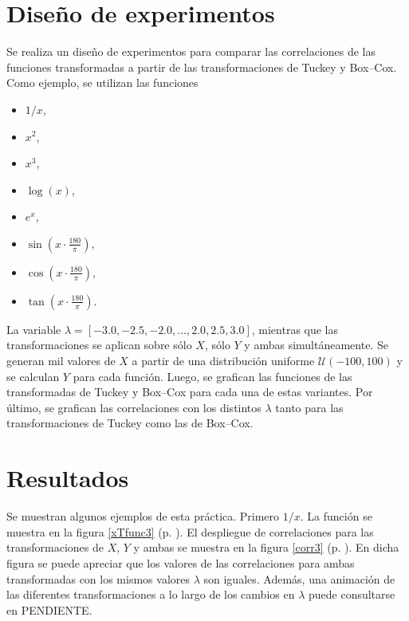 \documentclass[paper=leter, fontsize=11pt]{scrartcl}
\numberwithin{equation}{section}		%
\numberwithin{figure}{section}			%
\numberwithin{table}{section}				%
\begin{document}
\section{Diseño de experimentos}
Se realiza un diseño de experimentos para comparar las correlaciones de las funciones transformadas a partir de las transformaciones de Tuckey y Box--Cox. Como ejemplo, se utilizan las funciones
\begin{itemize}
    \item $1 / x$,
    \item $x ^ 2$,
    \item $x ^ 3$,
    \item $\log (x)$,
    \item $e ^ x$,
    \item $\sin(x \cdot \frac{180}{\pi})$,
    \item $\cos(x \cdot \frac{180}{\pi})$,
    \item $\tan(x \cdot \frac{180}{\pi})$.
\end{itemize}

La variable  $\lambda = [-3.0, -2.5, -2.0, \ldots, 2.0, 2.5, 3.0 ]$, mientras que las transformaciones se aplican sobre sólo $X$, sólo $Y$ y ambas simultáneamente. Se generan mil valores de $X$ a partir de una distribución uniforme $\mathcal{U}(-100, 100)$ y se calculan $Y$ para cada función. Luego, se grafican las funciones de las transformadas de Tuckey y Box--Cox para cada una de estas variantes. Por último, se grafican las correlaciones con los distintos $\lambda$ tanto para las transformaciones de Tuckey como las de Box--Cox.

\section{Resultados}
Se muestran algunos ejemplos de esta práctica. Primero $1/x$. La función se muestra en la figura \ref{xTfunc3} (p. \pageref{xTfunc3}). El despliegue de correlaciones para las transformaciones de $X$, $Y$ y ambas se muestra en la figura \ref{corr3} (p. \pageref{corr3}). En dicha figura se puede apreciar que los valores de las correlaciones para ambas transformadas con los mismos valores $\lambda$ son iguales. Además, una animación de las diferentes transformaciones a lo largo de los cambios en $\lambda$ puede consultarse en PENDIENTE.
\end{document}
